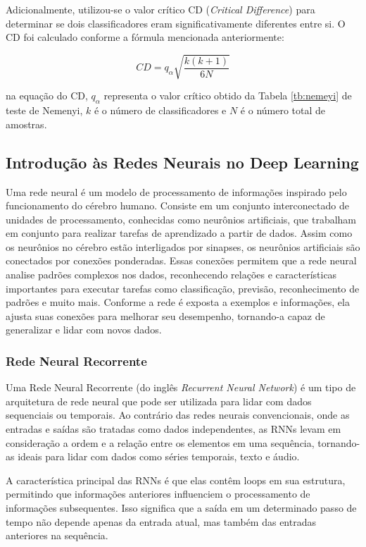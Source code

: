 Adicionalmente, utilizou-se o valor crítico CD (\textit{Critical Difference}) para determinar se dois classificadores eram significativamente diferentes entre si. O CD foi calculado conforme a fórmula mencionada anteriormente:

\begin{equation}
	CD = q_\alpha \sqrt{\frac{k(k+1)}{6N}}
\end{equation}

\noindent na equação do CD, $q_\alpha$ representa o valor crítico obtido da Tabela \ref{tb:nemeyi} de teste de Nemenyi, $k$ é o número de classificadores e $N$ é o número total de amostras.

\subsection{Introdu\c c\~ao \`as Redes Neurais no Deep Learning}

Uma rede neural é um modelo de processamento de informações inspirado pelo funcionamento do cérebro humano. Consiste em um conjunto interconectado de unidades de processamento, conhecidas como neurônios artificiais, que trabalham em conjunto para realizar tarefas de aprendizado a partir de dados. Assim como os neurônios no cérebro estão interligados por sinapses, os neurônios artificiais são conectados por conexões ponderadas. Essas conexões permitem que a rede neural analise padrões complexos nos dados, reconhecendo relações e características importantes para executar tarefas como classificação, previsão, reconhecimento de padrões e muito mais. Conforme a rede é exposta a exemplos e informações, ela ajusta suas conexões para melhorar seu desempenho, tornando-a capaz de generalizar e lidar com novos dados.

\subsubsection{Rede Neural Recorrente}


Uma Rede Neural Recorrente (do inglês \textit{Recurrent Neural Network}) é um tipo de arquitetura de rede neural que pode ser utilizada para lidar com dados sequenciais ou temporais. Ao contrário das redes neurais convencionais, onde as entradas e saídas são tratadas como dados independentes, as RNNs levam em consideração a ordem e a relação entre os elementos em uma sequência, tornando-as ideais para lidar com dados como séries temporais, texto e áudio.

A característica principal das RNNs é que elas contêm loops em sua estrutura, permitindo que informações anteriores influenciem o processamento de informações subsequentes. Isso significa que a saída em um determinado passo de tempo não depende apenas da entrada atual, mas também das entradas anteriores na sequência.


